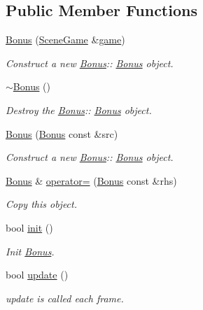 \subsection*{Public Member Functions}
\begin{DoxyCompactItemize}
\item 
\hyperlink{class_bonus_a35c21e394ed7467d9bf1038cffc77047}{Bonus} (\hyperlink{class_scene_game}{Scene\+Game} \&\hyperlink{class_a_entity_aa2c05db944a8b7487eb8470dd20211ab}{game})
\begin{DoxyCompactList}\small\item\em Construct a new \hyperlink{class_bonus}{Bonus}\+:\+: \hyperlink{class_bonus}{Bonus} object. \end{DoxyCompactList}\item 
\mbox{\label{class_bonus_ace96cd91925b1f65b2c8596930fed6f5}} 
\hyperlink{class_bonus_ace96cd91925b1f65b2c8596930fed6f5}{$\sim$\+Bonus} ()
\begin{DoxyCompactList}\small\item\em Destroy the \hyperlink{class_bonus}{Bonus}\+:\+: \hyperlink{class_bonus}{Bonus} object. \end{DoxyCompactList}\item 
\hyperlink{class_bonus_aedadb1a74a12d5c42f7dc26db1823ebd}{Bonus} (\hyperlink{class_bonus}{Bonus} const \&src)
\begin{DoxyCompactList}\small\item\em Construct a new \hyperlink{class_bonus}{Bonus}\+:\+: \hyperlink{class_bonus}{Bonus} object. \end{DoxyCompactList}\item 
\hyperlink{class_bonus}{Bonus} \& \hyperlink{class_bonus_a739b5ec5b1e7214fd0398e4a7970529e}{operator=} (\hyperlink{class_bonus}{Bonus} const \&rhs)
\begin{DoxyCompactList}\small\item\em Copy this object. \end{DoxyCompactList}\item 
bool \hyperlink{class_bonus_a976414b70e76b18dadeae3f316a22547}{init} ()
\begin{DoxyCompactList}\small\item\em Init \hyperlink{class_bonus}{Bonus}. \end{DoxyCompactList}\item 
bool \hyperlink{class_bonus_a0dd8aa4474c3d1ef494ed8a916cc16cd}{update} ()
\begin{DoxyCompactList}\small\item\em update is called each frame. \end{DoxyCompactList}\item 

\end{DoxyCompactItemize}
